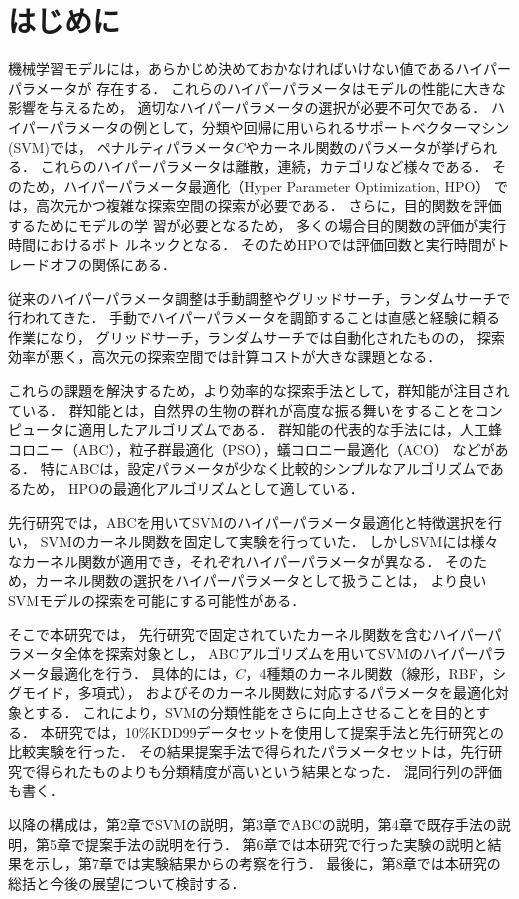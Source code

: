 \section{はじめに}
機械学習モデルには，あらかじめ決めておかなければいけない値であるハイパーパラメータが
存在する．
これらのハイパーパラメータはモデルの性能に大きな影響を与えるため，
適切なハイパーパラメータの選択が必要不可欠である\cite{essential}．
ハイパーパラメータの例として，分類や回帰に用いられるサポートベクターマシン(SVM)では，
ペナルティパラメータ$C$やカーネル関数のパラメータが挙げられる．
これらのハイパーパラメータは離散，連続，カテゴリなど様々である．
そのため，ハイパーパラメータ最適化（Hyper Parameter Optimization, HPO）
では，高次元かつ複雑な探索空間の探索が必要である．
さらに，目的関数を評価するためにモデルの学
習が必要となるため，
多くの場合目的関数の評価が実行時間におけるボト
ルネックとなる．
そのためHPOでは評価回数と実行時間がトレードオフの関係にある\cite{trade}．

従来のハイパーパラメータ調整は手動調整やグリッドサーチ，ランダムサーチで行われてきた．
手動でハイパーパラメータを調節することは直感と経験に頼る作業になり，
グリッドサーチ，ランダムサーチでは自動化されたものの，
探索効率が悪く，高次元の探索空間では計算コストが大きな課題となる．

これらの課題を解決するため，より効率的な探索手法として，群知能が注目されている．
群知能とは，自然界の生物の群れが高度な振る舞いをすることをコンピュータに適用したアルゴリズムである\cite{population}．
群知能の代表的な手法には，人工蜂コロニー（ABC），粒子群最適化（PSO），蟻コロニー最適化（ACO）
などがある．
特にABCは，設定パラメータが少なく比較的シンプルなアルゴリズムであるため，
HPOの最適化アルゴリズムとして適している．

先行研究では，ABCを用いてSVMのハイパーパラメータ最適化と特徴選択を行い，
SVMのカーネル関数を固定して実験を行っていた\cite{origin}．
しかしSVMには様々なカーネル関数が適用でき，それぞれハイパーパラメータが異なる．
そのため，カーネル関数の選択をハイパーパラメータとして扱うことは，
より良いSVMモデルの探索を可能にする可能性がある．

そこで本研究では，
先行研究で固定されていたカーネル関数を含むハイパーパラメータ全体を探索対象とし，
ABCアルゴリズムを用いてSVMのハイパーパラメータ最適化を行う．
具体的には，$C$，4種類のカーネル関数（線形，RBF，シグモイド，多項式），
およびそのカーネル関数に対応するパラメータを最適化対象とする．
これにより，SVMの分類性能をさらに向上させることを目的とする．
 本研究では，10\%KDD99データセットを使用して提案手法と先行研究との比較実験を行った．
その結果提案手法で得られたパラメータセットは，先行研究で得られたものよりも分類精度が高いという結果となった．
混同行列の評価も書く．

以降の構成は，第2章でSVMの説明，第3章でABCの説明，第4章で既存手法の説明，第5章で提案手法の説明を行う．
第6章では本研究で行った実験の説明と結果を示し，第7章では実験結果からの考察を行う．
最後に，第8章では本研究の総括と今後の展望について検討する．
